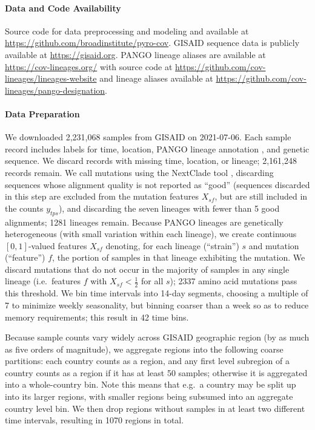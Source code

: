 \documentclass[12pt]{article}
\begin{document}
\paragraph*{Data and Code Availability}

Source code for data preprocessing and modeling and available at
\url{https://github.com/broadinstitute/pyro-cov}.
GISAID sequence data is publicly available at
\url{https://gisaid.org}.
PANGO lineage aliases are available at \url{https://cov-lineages.org/} with source code at \url{https://github.com/cov-lineages/lineages-website} and lineage aliases available at \url{https://github.com/cov-lineages/pango-designation}.

\paragraph*{Data Preparation}

We downloaded 2,231,068 samples from GISAID 
\cite{elbe2017gisaid} on 2021-07-06.
Each sample record includes labels for time, location, PANGO lineage annotation \cite{rambaut2020dynamic}, and genetic sequence.
We discard records with missing time, location, or lineage; 2,161,248 records remain.
We call mutations using the NextClade tool \cite{aksamentov2020nextclade}, discarding sequences whose alignment quality is not reported as ``good'' (sequences discarded in this step are excluded from the mutation features $X_{sf}$, but are still included in the counts $y_{tps}$), and discarding the seven lineages with fewer than 5 good alignments; 1281 lineages remain.
Because PANGO lineages are genetically heterogeneous (with small variation within each lineage), we create continuous $[0, 1]$-valued features $X_{sf}$ denoting, for each lineage (``strain'') $s$ and mutation (``feature'') $f$, the portion of samples in that lineage exhibiting the mutation.
We discard mutations that do not occur in the majority of samples in any single lineage (i.e.~features $f$ with $X_{sf}<\tfrac{1}{2}$ for all $s$); 2337 amino acid mutations pass this threshold.
We bin time intervals into 14-day segments, choosing a multiple of 7 to minimize weekly seasonality, but binning coarser than a week so as to reduce memory requirements; this result in 42 time bins.

Because sample counts vary widely across GISAID geographic region (by as much as five orders of magnitude), we aggregate regions into the following coarse partitions: each country counts as a region, and any first level subregion of a country counts as a region if it has at least 50 samples; otherwise it is aggregated into a whole-country bin.
Note this means that e.g.~a country may be split up into its larger regions, with smaller regions being subsumed into an aggregate country level bin.
We then drop regions without samples in at least two different time intervals, resulting in 1070 regions in total.
\end{document}
